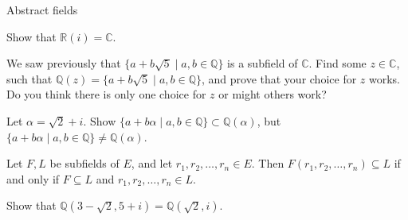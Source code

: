 \begin{section}{Abstract fields}
\begin{problem}
Show that $\mathbb{R}(i) =\mathbb{C}$. 
\end{problem}

\begin{problem}
We saw previously that $\{a+b\sqrt{5}\mid a,b\in \mathbb{Q}\}$ is a subfield of $\mathbb{C}$. Find some $z\in \mathbb{C}$, such that $\mathbb{Q}(z) = \{a+b\sqrt{5}\mid a,b\in \mathbb{Q}\}$, and prove that your choice for $z$ works. Do you think there is only one choice for $z$ or might others work?
\end{problem}

\begin{problem}\label{prob.QAdjoinRoot2PlusI}
Let $\alpha = \sqrt{2} + i$. Show  $\{a+b\alpha\mid a,b\in \mathbb{Q}\} \subset \mathbb{Q}(\alpha)$, but $\{a+b\alpha\mid a,b\in \mathbb{Q}\} \neq \mathbb{Q}(\alpha)$. 
\end{problem}


\begin{theorem}
Let $F,L$ be subfields of $E$, and let $r_1,r_2,\ldots,r_n \in E$. Then $F(r_1,r_2,\ldots,r_n) \subseteq L$ if and only if $F\subseteq L$ and $r_1,r_2,\ldots,r_n\in L$.
\end{theorem}

\begin{problem}\label{prob.QAdjoinRoot27Root7}
Show that $\mathbb{Q}\left(3-\sqrt{2},5+i\right) = \mathbb{Q}\left(\sqrt{2},i\right)$.
\end{problem}


\end{section}
